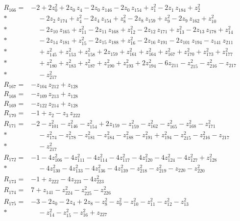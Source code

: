 \documentclass[11pt]{article}
\theoremstyle{remark}\newtheorem{remark}[theorem]{Remark}
\begin{document}
\begin{align*}
R_{166}={}& -2 + 2z_{0}^{2} + 2z_{0}\,z_{4} - 2z_{0}\,z_{146} - 2z_{0}\,z_{154} + z_{1}^{2} - 2z_{1}\,z_{184} + z_{2}^{2} \\*
&\quad  - 2z_{2}\,z_{174} + z_{4}^{2} - 2z_{4}\,z_{154} + z_{8}^{2} - 2z_{8}\,z_{159} + z_{9}^{2} - 2z_{9}\,z_{162} + z_{10}^{2} \\*
&\quad  - 2z_{10}\,z_{165} + z_{11}^{2} - 2z_{11}\,z_{168} + z_{12}^{2} - 2z_{12}\,z_{171} + z_{13}^{2} - 2z_{13}\,z_{178} + z_{14}^{2} \\*
&\quad  - 2z_{14}\,z_{181} + z_{15}^{2} - 2z_{15}\,z_{188} + z_{16}^{2} - 2z_{16}\,z_{191} - 2z_{101}\,z_{194} - z_{141}\,z_{211} \\*
&\quad  + z_{145}^{2} + z_{153}^{2} + z_{158}^{2} + 2z_{159} + z_{161}^{2} + z_{164}^{2} + z_{167}^{2} + z_{170}^{2} + z_{173}^{2} + z_{177}^{2} \\*
&\quad  + z_{180}^{2} + z_{183}^{2} + z_{187}^{2} + z_{190}^{2} + z_{193}^{2} + 2z_{194}^{2} - 6z_{211} - z_{215}^{2} - z_{216}^{2} - z_{217} \\*
&\quad  - z_{217}^{2} \\[2pt]
R_{167}={}& -z_{104}\,z_{212} + z_{128} \\[2pt]
R_{168}={}& -z_{109}\,z_{213} + z_{128} \\[2pt]
R_{169}={}& -z_{122}\,z_{214} + z_{128} \\[2pt]
R_{170}={}& -1 + z_{2} - z_{3}\,z_{222} \\[2pt]
R_{171}={}& -2 - z_{101}^{2} - z_{146}^{2} - z_{154}^{2} + 2z_{159} - z_{159}^{2} - z_{162}^{2} - z_{165}^{2} - z_{168}^{2} - z_{171}^{2} \\*
&\quad  - z_{174}^{2} - z_{178}^{2} - z_{181}^{2} - z_{184}^{2} - z_{188}^{2} - z_{191}^{2} + z_{194}^{2} - z_{215}^{2} - z_{216}^{2} - z_{217} \\*
&\quad  - z_{217}^{2} \\[2pt]
R_{172}={}& -1 - 4z_{106}^{2} - 4z_{111}^{2} - 4z_{114}^{2} - 4z_{117}^{2} - 4z_{120}^{2} - 4z_{124}^{2} - 4z_{127}^{2} + z_{128}^{2} \\*
&\quad  - 4z_{130}^{2} - 4z_{133}^{2} - 4z_{136}^{2} - 4z_{139}^{2} - z_{218}^{2} - z_{219}^{2} - z_{220} - z_{220}^{2} \\[2pt]
R_{173}={}& -1 + z_{222} - 4z_{223} - 4z_{223}^{2} \\[2pt]
R_{174}={}& 7 + z_{141} - z_{224}^{2} - z_{225}^{2} - z_{226}^{2} \\[2pt]
R_{175}={}& -3 - 2z_{0} - 2z_{4} + 2z_{8} - z_{8}^{2} - z_{9}^{2} - z_{10}^{2} - z_{11}^{2} - z_{12}^{2} - z_{13}^{2} \\*
&\quad  - z_{14}^{2} - z_{15}^{2} - z_{16}^{2} + z_{227} \\
\end{align*}
\endgroup
\clearpage
\end{document}
